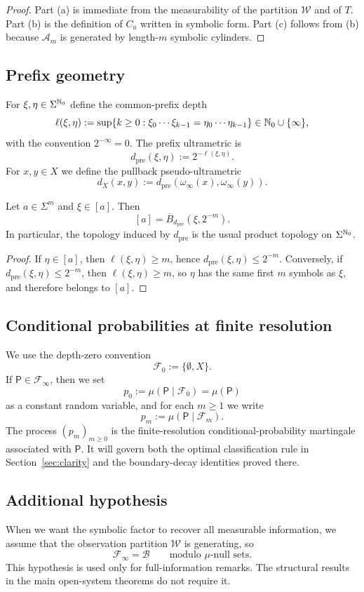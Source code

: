 \begin{proof}
Part (a) is immediate from the measurability of the partition
\(\mathcal W\) and of \(T\).
Part (b) is the definition of $C_a$ written in symbolic form.
Part (c) follows from (b) because $\mathcal{A}_m$ is generated by length-$m$
symbolic cylinders.
\end{proof}

\subsection{Prefix geometry}

For $\xi,\eta\in\Sigma^{\mathbb{N}_0}$ define the common-prefix depth
\[
  \ell(\xi,\eta):=\sup\{k\ge 0:\xi_0\cdots\xi_{k-1}=\eta_0\cdots\eta_{k-1}\}
  \in\mathbb{N}_0\cup\{\infty\},
\]
with the convention $2^{-\infty}=0$. The prefix ultrametric is
\[
  d_{\mathrm{pre}}(\xi,\eta):=2^{-\ell(\xi,\eta)}.
\]
For $x,y\in X$ we define the pullback pseudo-ultrametric
\[
  d_X(x,y):=d_{\mathrm{pre}}(\omega_\infty(x),\omega_\infty(y)).
\]

\begin{lemma}\label{lem:prefix-ball-cylinder}
Let $a\in\Sigma^m$ and $\xi\in[a]$. Then
\[
  [a]=\overline{B}_{d_{\mathrm{pre}}}(\xi,2^{-m}).
\]
In particular, the topology induced by $d_{\mathrm{pre}}$ is the usual product
topology on $\Sigma^{\mathbb{N}_0}$.
\end{lemma}

\begin{proof}
If $\eta\in[a]$, then $\ell(\xi,\eta)\ge m$, hence
$d_{\mathrm{pre}}(\xi,\eta)\le 2^{-m}$.
Conversely, if $d_{\mathrm{pre}}(\xi,\eta)\le 2^{-m}$, then
$\ell(\xi,\eta)\ge m$, so $\eta$ has the same first $m$ symbols as $\xi$, and
therefore belongs to $[a]$.
\end{proof}

\subsection{Conditional probabilities at finite resolution}

We use the depth-zero convention
\[
  \mathcal{F}_0:=\{\emptyset,X\}.
\]
If $\mathsf{P}\in\mathcal{F}_\infty$, then we set
\[
  p_0:=\mu(\mathsf{P}\mid\mathcal{F}_0)=\mu(\mathsf{P})
\]
as a constant random variable, and for each $m\ge 1$ we write
\[
  p_m:=\mu(\mathsf{P}\mid\mathcal{F}_m).
\]
The process $(p_m)_{m\ge 0}$ is the finite-resolution conditional-probability
martingale associated with $\mathsf{P}$. It will govern both the optimal
classification rule in Section~\ref{sec:clarity} and the boundary-decay
identities proved there.

\subsection{Additional hypothesis}

When we want the symbolic factor to recover all measurable information, we
assume that the observation partition \(\mathcal W\) is generating, so
\[
  \mathcal{F}_\infty=\mathcal{B}
  \qquad\text{modulo \(\mu\)-null sets.}
\]
This hypothesis is used only for full-information remarks.  The structural
results in the main open-system theorems do not require it.
